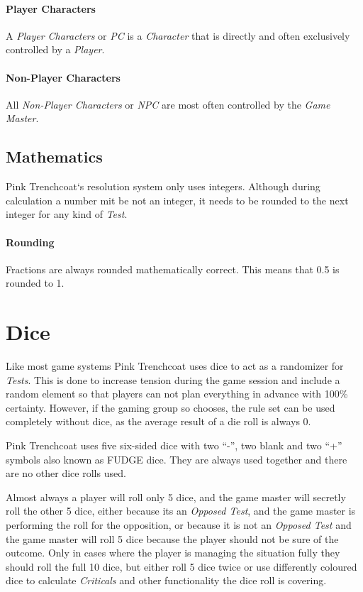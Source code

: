 \paragraph{Player Characters}

A \emph{Player Characters} or \emph{PC} is a \emph{Character} that is directly and often
exclusively controlled by a \emph{Player}.

\paragraph{Non-Player Characters}

All \emph{Non-Player Characters} or \emph{NPC} are most often controlled by the \emph{Game Master}.

\subsection{Mathematics}

Pink Trenchcoat`s resolution system only uses integers. Although during calculation
a number mit be not an integer, it needs to be rounded to the next integer for any
kind of \emph{Test}.

\paragraph{Rounding}

Fractions are always rounded mathematically correct. This means that 0.5 is
rounded to 1.

\section{Dice}

Like most game systems Pink Trenchcoat uses dice to act as a randomizer for
\emph{Tests}. This is done to increase tension during the game session and include
a random element so that players can not plan everything in advance with 100\%
certainty. However, if the gaming group so chooses, the rule set can be used
completely without dice, as the average result of a die roll is always 0.

Pink Trenchcoat uses five six-sided dice with two “-”, two blank and two “+”
symbols also known as FUDGE dice. They are always used together and there are no
other dice rolls used.


Almost always a player will roll only 5 dice,
and the game master will secretly roll the other 5 dice, either because its
an \emph{Opposed Test}, and the game master is performing the roll for the
opposition, or because it is not an \emph{Opposed Test} and the game master will
roll 5 dice because the player should not be sure of the outcome. Only in cases where
the player is managing the situation fully they should roll the full 10 dice, but
either roll 5 dice twice or use differently coloured dice to calculate
\emph{Criticals} and other functionality the dice roll is covering.

